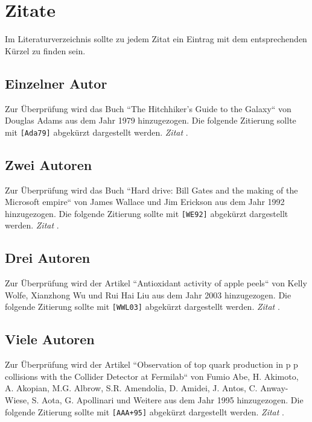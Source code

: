 \section{Zitate}

Im Literaturverzeichnis sollte zu jedem Zitat ein Eintrag mit dem entsprechenden Kürzel zu finden sein.

\subsection{Einzelner Autor}

Zur Überprüfung wird das Buch ``The Hitchhiker's Guide to the Galaxy``  von Douglas Adams aus dem Jahr 1979 hinzugezogen. Die folgende Zitierung sollte mit \texttt{[Ada79]}  abgekürzt dargestellt werden. \textit{Zitat} \cite{TestCitation001}.

\subsection{Zwei Autoren}

Zur Überprüfung wird das Buch ``Hard drive: Bill Gates and the making of the Microsoft empire`` von James Wallace und Jim Erickson aus dem Jahr 1992 hinzugezogen. Die folgende Zitierung sollte mit \texttt{[WE92]} abgekürzt dargestellt werden. \textit{Zitat} \cite{TestCitation002}.

\subsection{Drei Autoren}

Zur Überprüfung wird der Artikel ``Antioxidant activity of apple peels`` von Kelly Wolfe, Xianzhong Wu und Rui Hai Liu aus dem Jahr 2003 hinzugezogen. Die folgende Zitierung sollte mit \texttt{[WWL03]} abgekürzt dargestellt werden. \textit{Zitat} \cite{TestCitation003}.

\subsection{Viele Autoren}

Zur Überprüfung wird der Artikel ``Observation of top quark production in p p collisions with the Collider Detector at Fermilab`` von Fumio Abe, H. Akimoto, A. Akopian, M.G. Albrow, S.R. Amendolia, D. Amidei, J. Antos, C. Anway-Wiese, S. Aota, G. Apollinari und Weitere aus dem Jahr 1995 hinzugezogen. Die folgende Zitierung sollte mit \texttt{[AAA+95]} abgekürzt dargestellt werden. \textit{Zitat} \cite{TestCitation004}.

